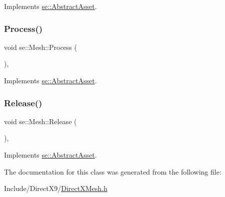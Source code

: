 Implements \mbox{\hyperlink{classse_1_1_abstract_asset_afb4dff418acf169d81b6ca5d8c1f6548}{se\+::\+Abstract\+Asset}}.

\mbox{\label{classse_1_1_mesh_a1ae42a794ee240b5d6a0dd46aa4ea60d}} 
\subsubsection{\texorpdfstring{Process()}{Process()}}
{\footnotesize\ttfamily void se\+::\+Mesh\+::\+Process (\begin{DoxyParamCaption}{ }\end{DoxyParamCaption})\hspace{0.3cm}{\ttfamily [override]}, {\ttfamily [virtual]}}



Implements \mbox{\hyperlink{classse_1_1_abstract_asset_a1f2fdf75bbeaddec16dc4778063505b7}{se\+::\+Abstract\+Asset}}.

\mbox{\label{classse_1_1_mesh_afde4ccf6665a9b6c7a8f3635dd5139e0}} 
\subsubsection{\texorpdfstring{Release()}{Release()}}
{\footnotesize\ttfamily void se\+::\+Mesh\+::\+Release (\begin{DoxyParamCaption}{ }\end{DoxyParamCaption})\hspace{0.3cm}{\ttfamily [override]}, {\ttfamily [virtual]}}



Implements \mbox{\hyperlink{classse_1_1_abstract_asset_aea97e36f647efdb07a801b6fc468388d}{se\+::\+Abstract\+Asset}}.



The documentation for this class was generated from the following file\+:\begin{DoxyCompactItemize}
\item 
Include/\+Direct\+X9/\mbox{\hyperlink{_direct_x_mesh_8h}{Direct\+X\+Mesh.\+h}}\end{DoxyCompactItemize}
